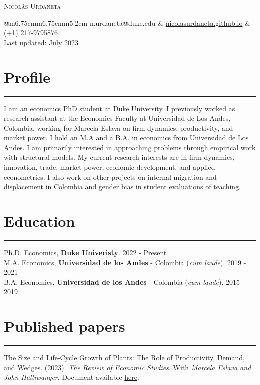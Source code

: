 \documentclass[12pt, letterpaper]{article}
\begin{document}
 

\begin{center}
{\Huge \textsc{Nicolás Urdaneta}}
\vspace*{5mm}

\begin{tabular}{@{}m{6.75cm}m{6.75cm}m{5.2cm}}
\noindent n.urdaneta@duke.edu & \href{nicolasurdaneta.github.io}{nicolasurdaneta.github.io} & (+1) 217-9795876 \\
Last updated: July 2023
\end{tabular}
\vspace*{-7mm}

\end{center}
\section*{Profile}
\vspace*{-8mm}
\noindent \rule{\linewidth}{0.2mm}
\noindent I am an economics PhD student at Duke University. I previously worked as research assistant at the Economics Faculty at Universidad de Los Andes, Colombia, working for Marcela Eslava on firm dynamics, productivity, and market power. I hold an M.A and a B.A. in economics from Universidad de Los Andes. I am primarily interested in approaching problems through empirical work with structural models. My current research interests are in firm dynamics, innovation, trade, market power, economic development, and applied econometrics. I also work on other projects on internal migration and displacement in Colombia and gender bias in student evaluations of teaching. 

\vspace*{-4mm}

\section*{Education}
\vspace*{-8mm}
\noindent \rule{\linewidth}{0.2mm}
\noindent
Ph.D. Economics, \textbf{Duke Univeristy}. \hfill 2022 - Present \\
M.A. Economics, \textbf{Universidad de los Andes} - Colombia (\textit{cum laude}). \hfill 2019 - 2021 \\
B.A. Economics, \textbf{Universidad de los Andes} - Colombia (\textit{cum laude}). \hfill 2015 - 2019

\vspace*{-2mm}

\section*{Published papers}
\vspace*{-8mm}
\noindent \rule{\linewidth}{0.2mm}
\noindent The Size and Life-Cycle Growth of Plants: The Role of Productivity, Demand, and Wedges. (2023). \textit{The Review of Economic Studies}.   With \textit{Marcela Eslava and John Haltiwanger}. Document available \href{https://academic.oup.com/restud/advance-article/doi/10.1093/restud/rdad029/7054272?login=true}{here}. 
\end{document}
